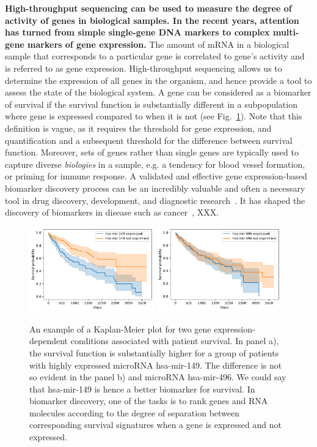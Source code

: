 \documentclass[11pt,a4paper]{article}
\renewcommand{\bold}{\textbf}
\begin{document}
\bold{High-throughput sequencing can be used to measure the degree of activity of genes in biological samples. In the recent years, attention has turned from simple single-gene DNA markers to complex multi-gene markers of gene expression.} The amount of mRNA in a biological sample that corresponds to a particular gene is correlated to gene's activity and is referred to as gene expression. High-throughput sequencing allows us to determine the expression of all genes in the organism, and hence provide a tool to assess the state of the biological system. A gene can be considered as a biomarker of survival if the survival function is substantially different in a subpopulation where gene is expressed compared to when it is not (see Fig.~\ref{fig:km-marker}). Note that this definition is vague, as it requires the threshold for gene expression, and quantification and a subsequent threshold for the difference between survival function. Moreover, sets of genes rather than single genes are typically used to capture diverse {\em biologies} in a sample, e.g. a tendency for blood vessel formation, or priming for immune response. A validated and effective gene expression-based biomarker discovery process can be an incredibly valuable and often a necessary tool in drug discovery, development, and diagnostic research~\cite{MonforteMcPhail2005}. It has shaped the discovery of biomarkers in disease such as cancer~\cite{HENRY2012140}, XXX.

\begin{figure}
\includegraphics[width=0.48\textwidth]{hsa-mir-149}\hfill
\includegraphics[width=0.48\textwidth]{hsa-mir-496}
\caption{An example of a Kaplan-Meier plot for two gene expression-dependent conditions associated with patient survival. In panel a), the survival function is substantially higher for a group of patients with highly expressed microRNA hsa-mir-149. The difference is not so evident in the panel b) and microRNA hsa-mir-496. We could say that hsa-mir-149 is hence a better biomarker for survival. In biomarker discovery, one of the tasks is to rank genes and RNA molecules according to the degree of separation between corresponding survival signatures when a gene is expressed and not expressed.}
\label{fig:km-marker}
\end{figure}
\end{document}
